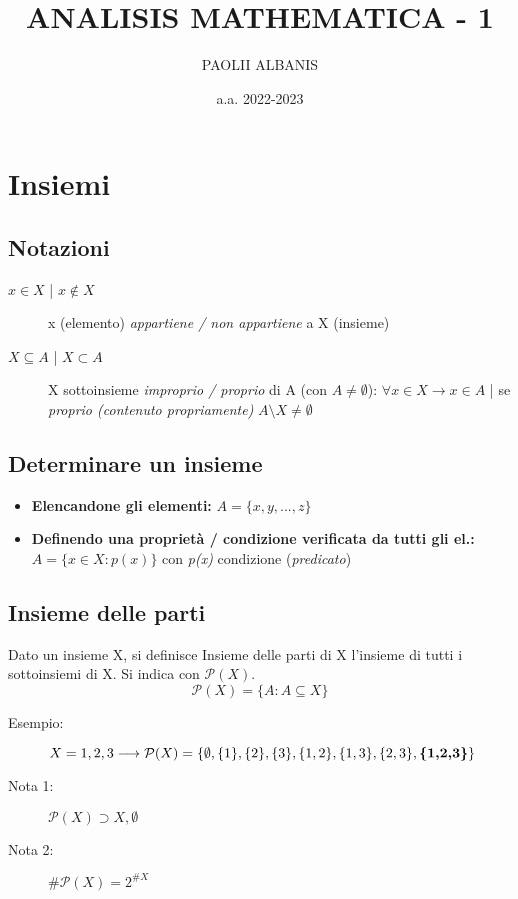 \documentclass[10pt]{article}
\title{ANALISIS MATHEMATICA - 1}
\author{PAOLII ALBANIS}
\date{a.a. 2022-2023}
\theoremstyle{plain}
\begin{document}
\maketitle

\tableofcontents
\newpage

\section{Insiemi}

\subsection{Notazioni}

\begin{description}
\item[\boldmath $x \in X$  | $x \notin X$] x (elemento) \textit{appartiene / non appartiene} a X (insieme)
\item[\boldmath $X \subseteq A$  |  $X \subset A$] X sottoinsieme \textit{improprio / proprio} di A (con $A \neq \emptyset $): $\forall x \in X \rightarrow x \in A$ | se \textit{proprio (contenuto propriamente)} $A \setminus X \neq \emptyset $
\end{description}

\subsection{Determinare un insieme}
\begin{itemize}[label= $\ast$]
\item \textbf{Elencandone gli elementi:} $A = \{x,y,...,z\}$
\item \textbf{Definendo una proprietà / condizione verificata da tutti gli el.:} \newline $A = \{x \in X : p(x)\}$ con \textit{p(x)} condizione (\textit{predicato})
\end{itemize}

\subsection{Insieme delle parti}
\begin{defin}
Dato un insieme X, si definisce Insieme delle parti di X l'insieme di tutti i sottoinsiemi di X. Si indica con $\mathcal{P}(X)$. \[\mathcal{P}(X) = \{A : A \subseteq X\}\]
\end{defin}
\begin{description} \item[Esempio:] $X = {1,2,3} \longrightarrow \mathcal{P}(X) = \{\emptyset,\{1\},\{2\},\{3\},\{1,2\},\{1,3\},\{2,3\},\textrm{\textbf{\{1,2,3\}}}\}$
\item[Nota 1:] $\mathcal{P}(X) \supset X, \emptyset$
\item[Nota 2:] $\# \mathcal{P}(X) = 2^{\#X}$
\end{description}
\end{document}
